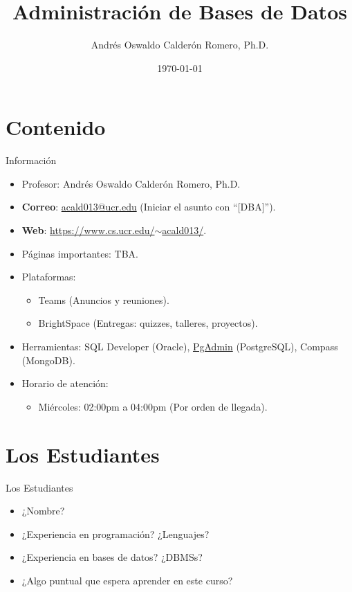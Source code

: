 \documentclass{beamer}
\title{Administración de Bases de Datos}
\author{Andrés Oswaldo Calderón Romero, Ph.D.}
\date{\today}
\begin{document}
\frame{\titlepage}

\section{Contenido}

\begin{frame}{Información}
\begin{itemize}
    \item Profesor: Andrés Oswaldo Calderón Romero, Ph.D.
    \item \textbf{Correo}: \href{mailto:acald013@ucr.edu}{acald013@ucr.edu} (Iniciar el asunto con ``[DBA]'').
    \item \textbf{Web}: \href{https://www.cs.ucr.edu/~acald013/}{https://www.cs.ucr.edu/$\sim$acald013/}.
    \item Páginas importantes: TBA.
    \item Plataformas: 
    \begin{itemize}
        \item Teams (Anuncios y reuniones).
        \item BrightSpace (Entregas: quizzes, talleres, proyectos).
    \end{itemize}
    \item Herramientas: SQL Developer (Oracle), \href{https://www.pgadmin.org/}{PgAdmin} (PostgreSQL), Compass (MongoDB).
    \item Horario de atención: 
    \begin{itemize}
        \item Miércoles: 02:00pm a 04:00pm (Por orden de llegada).
    \end{itemize}
\end{itemize}
\end{frame}

\section{Los Estudiantes}

\begin{frame}{Los Estudiantes}
\begin{itemize}
    \item ¿Nombre? 
    \item ¿Experiencia en programación? ¿Lenguajes? 
    \item ¿Experiencia en bases de datos? ¿DBMSs?
    \item ¿Algo puntual que espera aprender en este curso?
\end{itemize}
\end{frame}
\end{document}
